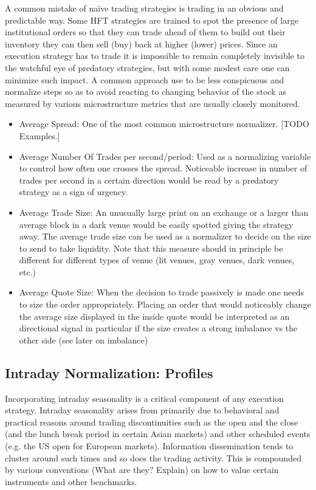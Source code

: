 A common mistake of na\"ive trading strategies is trading in an obvious and predictable way. Some HFT strategies are trained to spot the presence of large institutional orders so that they can trade ahead of them to build out their inventory they can then sell (buy) back at higher (lower) prices. Since an execution strategy has to trade it is impossible to remain completely invisible to the watchful eye of predatory strategies, but with some modest care one can minimize such impact. A common approach use to be less conspicuous and normalize steps so as to avoid reacting to changing behavior of the stock as measured by various microstructure metrics that are usually closely monitored.  
	\begin{itemize}
	\item Average Spread: One of the most common microstructure normalizer. [TODO Examples.] 
	\item Average Number Of Trades per second/period: Used as a normalizing variable to control how often one crosses the spread. Noticeable increase in number of trades per second in a certain direction would be read by a predatory strategy as a sign of urgency.
	\item Average Trade Size: An unusually large print on an exchange or a larger than average block in a dark venue would be easily spotted giving the strategy away. The average trade size can be used as a normalizer to decide on the size to send to take liquidity.  Note that this measure should in principle be different for different types of venue (lit venues, gray venues, dark venues, etc.)
	\item Average Quote Size: When the decision to trade passively is made one needs to size the order appropriately. Placing an order that would noticeably change the average size displayed in the inside quote would be interpreted as an directional signal in particular if the size creates a strong imbalance vs the other side (see later on imbalance)
	\end{itemize}


\subsection{Intraday Normalization: Profiles}

Incorporating intraday seasonality is a critical component of any execution strategy. Intraday seasonality arises from primarily due to behavioral and practical reasons around trading discontinuities such as the open and the close (and the lunch break period in certain Asian markets) and other scheduled events (e.g. the US open for European markets). Information dissemination tends to cluster around such times and so does the trading activity. This is compounded by various conventions (What are they? Explain) on how to value certain instruments and other benchmarks. 
  
